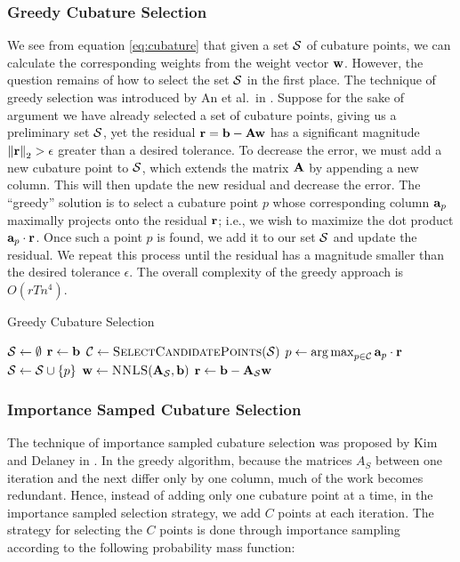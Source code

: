 {\subsubsection{Greedy Cubature Selection}
We see from equation \ref{eq:cubature} that given a set $\mathcal{S}$ of cubature points, we can calculate the corresponding weights from the weight vector $\ww$. However, the question remains of how to select
the set $\mathcal{S}$ in the first place. The technique of greedy selection was introduced by An et al.~in \cite{An:2008}. Suppose for the sake of argument we have already selected a set of cubature points, giving us a preliminary set $\mathcal{S}$, yet the residual $\mathbf{r} = \mathbf{b} - \mathbf{A} \mathbf{w}$ has a significant
magnitude $\left \lVert \mathbf{r} \right \rVert_2 > \epsilon$ greater than a desired tolerance. To decrease the error, we must add a new cubature point to $\mathcal{S}$, which extends the matrix $\mathbf{A}$ by appending a new column.
This will then update the new residual and decrease the error. The ``greedy'' solution is to select a cubature point $p$ whose corresponding column $\mathbf{a}_p$ maximally projects onto the residual $\mathbf{r}$; i.e., we
wish to maximize the dot product $\mathbf{a}_p \cdot \mathbf{r}$. Once such a point $p$ is found, we add it to our set $\mathcal{S}$ and update the residual. We repeat this process until the residual has a magnitude smaller than
the desired tolerance $\epsilon$. The overall complexity of the greedy approach is $O(rTn^4)$.

\begin{algorithm}
\caption{Greedy Cubature Selection}
\begin{algorithmic}[1]
\State $\mathcal{S} \gets \emptyset$
\State $\mathbf{r} \gets \mathbf{b}$
\State $\fancyC \gets \Call{SelectCandidatePoints}{\fancyS}$
\State $p \gets \operatorname*{arg\,max}_{p \in \mathcal{C}} {\mathbf{a}_p \cdot \mathbf{r}}$
\State $\mathcal{S} \gets \mathcal{S} \cup \{p\}$
\State $\ww \gets \Call{NNLS}{\boldA_{\fancyS},\bb}$
\State $\mathbf{r} \gets \mathbf{b} - \mathbf{A}_{\mathcal{S}} \mathbf{w}$
\EndWhile
\Return{$(\fancyS$, $\ww$)}
\EndFunction
\end{algorithmic}
\label{alg:greedy}
\end{algorithm}

\subsubsection{Importance Samped Cubature Selection}
The technique of importance sampled cubature selection was proposed by Kim and Delaney in \cite{Kim2013}. In the greedy algorithm, because the matrices $A_S$ between one iteration and the next differ only
by one column, much of the work becomes redundant. Hence, instead of adding only one cubature point at a time, in the importance sampled selection strategy, we add $C$ points at each iteration. The strategy
for selecting the $C$ points is done through importance sampling according to the following probability mass function:

}
